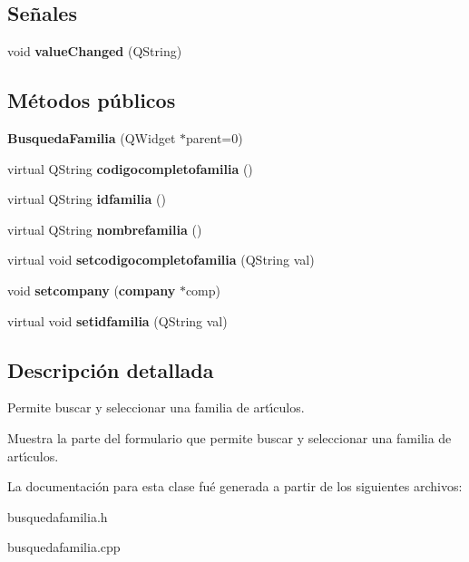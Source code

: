\subsection*{Se\~{n}ales}
\begin{CompactItemize}
\item 
void {\bf value\-Changed} (QString)\label{classBusquedaFamilia_l0}

\end{CompactItemize}
\subsection*{M\'{e}todos p\'{u}blicos}
\begin{CompactItemize}
\item 
{\bf Busqueda\-Familia} (QWidget $\ast$parent=0)\label{classBusquedaFamilia_a0}

\item 
virtual QString {\bf codigocompletofamilia} ()\label{classBusquedaFamilia_a1}

\item 
virtual QString {\bf idfamilia} ()\label{classBusquedaFamilia_a2}

\item 
virtual QString {\bf nombrefamilia} ()\label{classBusquedaFamilia_a3}

\item 
virtual void {\bf setcodigocompletofamilia} (QString val)\label{classBusquedaFamilia_a4}

\item 
void {\bf setcompany} ({\bf company} $\ast$comp)\label{classBusquedaFamilia_a5}

\item 
virtual void {\bf setidfamilia} (QString val)\label{classBusquedaFamilia_a6}

\end{CompactItemize}


\subsection{Descripci\'{o}n detallada}
Permite buscar y seleccionar una familia de art\'{\i}culos. 

Muestra la parte del formulario que permite buscar y seleccionar una familia de art\'{\i}culos. 



La documentaci\'{o}n para esta clase fu\'{e} generada a partir de los siguientes archivos:\begin{CompactItemize}
\item 
busquedafamilia.h\item 
busquedafamilia.cpp\end{CompactItemize}

